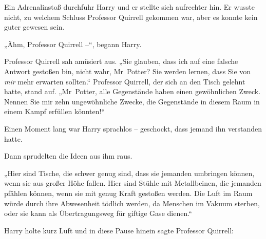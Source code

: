 Ein Adrenalinstoß durchfuhr Harry und er stellte sich aufrechter hin. Er wusste nicht, zu welchem Schluss Professor Quirrell gekommen war, aber es konnte kein guter gewesen sein.

„Ähm, Professor Quirrell –“, begann Harry.

Professor Quirrell sah amüsiert aus. „Sie glauben, dass ich auf eine falsche Antwort gestoßen bin, nicht wahr, Mr~Potter? Sie werden lernen, dass Sie von \emph{mir} mehr erwarten sollten.“ Professor Quirrell, der sich an den Tisch gelehnt hatte, stand auf. „Mr~Potter, alle Gegenstände haben einen gewöhnlichen Zweck. Nennen Sie mir zehn ungewöhnliche Zwecke, die Gegenstände in diesem Raum in einem Kampf erfüllen könnten!“

Einen Moment lang war Harry sprachlos – geschockt, dass jemand ihn verstanden hatte.

Dann sprudelten die Ideen aus ihm raus.

„Hier sind Tische, die schwer genug sind, dass sie jemanden umbringen können, wenn sie aus großer Höhe fallen. Hier sind Stühle mit Metallbeinen, die jemanden pfählen können, wenn sie mit genug Kraft gestoßen werden. Die Luft im Raum würde durch ihre Abwesenheit tödlich werden, da Menschen im Vakuum sterben, oder sie kann als Übertragungsweg für giftige Gase dienen.“

Harry holte kurz Luft und in diese Pause hinein sagte Professor Quirrell:

